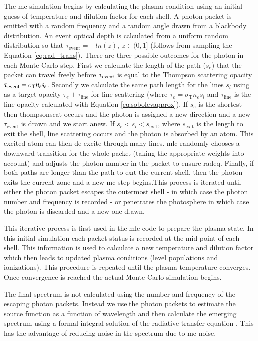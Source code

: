 The \gls{mc} simulation begins by calculating the plasma condition using an initial guess of temperature and dilution factor for each shell. A photon packet is emitted with a random frequency and a random angle drawn from a blackbody distribution.  An event optical depth is calculated from a uniform random distribution so that $\tau_\textrm{event}=-ln(z),\ z \in (0,1]$ (follows from sampling the Equation \ref{eq:rad_trans}).  There are three possible outcomes for the photon in each Monte Carlo step. First we calculate the length of the path ($s_e$) that the packet can travel freely before $\tau_{\rm event}$ is equal to the Thompson scattering opacity $\tau_{\rm event} = \sigma_\textrm{T} n_e s_e$. Secondly we calculate the same path length for the lines $s_l$ using as a target opacity $\tau_e + \tau_\textrm{line}$ for line scattering (where $\tau_e=\sigma_\textrm{T} n_e s_l$ and $\tau_\textrm{line}$ is the line opacity calculated with Equation \ref{eq:sobolevapprox}). If $s_e$ is the shortest then \gls{thompsonscat} occurs and the photon is assigned a new direction and a new $\tau_\textrm{event}$ is drawn and we start anew.  If $s_e<s_l<s_\textrm{exit}$, where $s_\textrm{exit}$ is the length to exit the shell, line scattering occurs and the photon is absorbed by an atom. This excited atom can then de-excite through many lines. \gls{mlc} randomly chooses a downward transition for the whole packet (taking the appropriate weights into account) and adjusts the photon number in the packet to ensure \gls{radeq}.  Finally, if both paths are longer than the path to exit the current shell, then the photon exits the current zone and a new \gls{mc} step begins.This process is iterated until either the photon packet escapes the outermost shell - in which case the photon number and frequency is recorded - or penetrates the photosphere in which case the photon is discarded and a new one drawn. 

This iterative process is first used in the \gls{mlc} code to prepare the plasma state. In this initial simulation each packet status is recorded at the mid-point of each shell. This information is used to calculate a new temperature and dilution factor which then leads to updated plasma conditions (level populations and ionizations). This procedure is repeated until the plasma temperature converges. Once convergence is reached the actual Monte-Carlo simulation begins. 

The final spectrum is not calculated using the number and frequency of the escaping photon packets. Instead we use the photon packets to estimate the source function as a function of wavelength and then calculate the emerging spectrum using a formal integral solution of the radiative transfer equation \citep[a more detailed description of this method in][]{2000A&A...363..705M}. This has the advantage of reducing noise in the spectrum due to \gls{mc} noise. 

